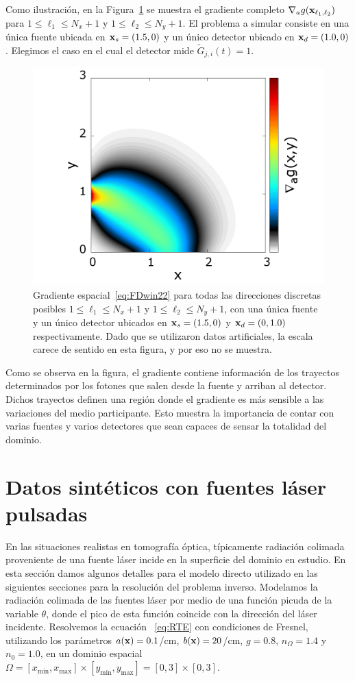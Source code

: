 Como ilustración, en la Figura~\ref{fig:gradient} se muestra 
el gradiente completo $\nabla_a g(\mathbf{x}_{\ell_1,\ell_2})$ para 
$1\leq \ell_1\leq N_x+1$ y $1\leq \ell_2\leq N_y+1$. 
El problema a simular consiste en una única fuente ubicada en $\mathbf{x}_s=(1.5,0)$ y un único detector ubicado en $\mathbf{x}_d=(1.0,0)$. 
Elegimos el caso en el cual el detector mide $\tilde G_{j,i}(t)=1$.
\begin{figure}[h!]
\centering
  \includegraphics[width=0.5\linewidth]{figuras/gradient.png}
  \caption{
  Gradiente espacial~\eqref{eq:FDwin22} para todas 
  las direcciones discretas posibles $1\leq \ell_1\leq N_x+1$ y $1\leq \ell_2\leq N_y+1$, 
  con una única fuente y un único detector ubicados en $\mathbf{x}_s=(1.5,0)$ 
  y $\mathbf{x}_d=(0,1.0)$ respectivamente. Dado que se utilizaron 
  datos artificiales, la escala carece de sentido en esta figura, 
  y por eso no se muestra.}
 \label{fig:gradient}
\end{figure} 
Como se observa en la figura, 
el gradiente contiene información de los trayectos determinados por los fotones que salen desde la fuente y arriban al detector. Dichos trayectos definen una región donde el gradiente es más 
sensible a las variaciones del medio participante. Esto muestra la importancia de contar con varias fuentes y varios detectores 
que sean capaces de sensar la totalidad del dominio. 
 
\section{Datos sintéticos con fuentes láser pulsadas} 
\label{sec:sintetic} 

En las situaciones realistas en tomografía óptica, típicamente 
radiación colimada proveniente de una fuente láser incide en 
la superficie del dominio en estudio. En esta sección damos 
algunos detalles para el modelo directo utilizado  
en las siguientes secciones para la resolución del problema inverso. 
Modelamos la radiación colimada de las fuentes láser por medio 
de una función picuda de la variable $\theta$, donde el pico 
de esta función coincide con la dirección del láser incidente. 
Resolvemos la ecuación~ \eqref{eq:RTE} con condiciones de Fresnel, 
utilizando los parámetros $a(\mathbf{x})=0.1$/cm, $b(\mathbf{x})=20$/cm, $g=0.8$, 
$n_{\Omega}=1.4$ y $n_0=1.0$, en un dominio espacial $\Omega=[x_{\text{min}},x_{\text{max}}]\times[y_{\text{min}},y_{\text{max}}]=[0,3]\times[0,3]$. 

